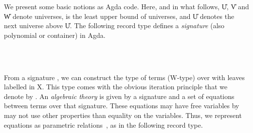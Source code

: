 \documentclass{easychair}
\begin{document}
We present some basic notions as Agda code.
Here, and in what follows, \U{U}, \U{V} and \U{W}
denote universes,  is the least upper bound of universes,
and \U{U} denotes the next universe above \U{U}.
The following record type defines a \emph{signature} (also polynomial or
container) in Agda.
\begin{code}%
\>[0]\AgdaSpace{}%
\AgdaSpace{}%
\AgdaSymbol{(}\AgdaSpace{}%
\AgdaSymbol{)}\AgdaSpace{}%
\AgdaSymbol{:}\AgdaSpace{}%
\AgdaSymbol{(}\AgdaSpace{}%
\AgdaSpace{}%
\AgdaSymbol{)}\AgdaSpace{}%
\AgdaSpace{}%
\AgdaSpace{}%
\<%
\\
\>[2][@{}l@{\AgdaIndent{0}}]%
\>[4]%
\>[9]\AgdaSymbol{:}\AgdaSpace{}%
\AgdaSpace{}%
\<%
\\
%
\>[4]%
\>[9]\AgdaSymbol{:}\AgdaSpace{}%
\AgdaSpace{}%
\AgdaSpace{}%
\AgdaSpace{}%
\<%
\end{code}
From a signature \sig \ofT {}, we can construct the type
 of terms (W-type) over \sig{} with leaves labelled in X.
This type comes with the obvious iteration principle that we denote by
.
An \emph{algebraic theory} is given by a signature and a set of equations
between terms over that signature.
These equations may have free variables by may not use other properties than
equality on the variables.
Thus, we represent equations as parametric
relations~\cite{Hermida14:LogicalRelationsParametricity}, as in the following
record type.
\end{document}
